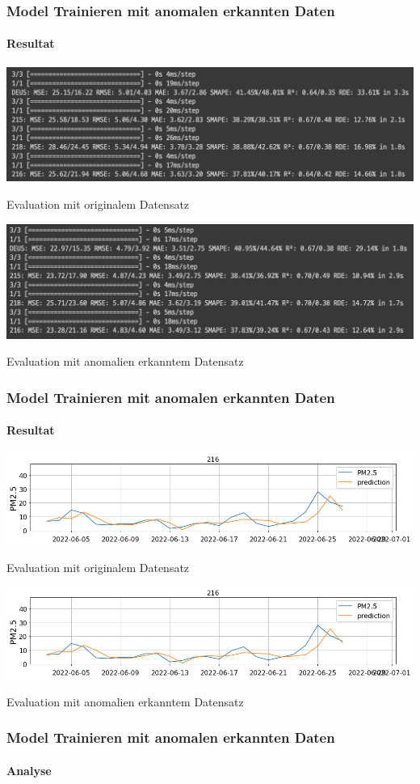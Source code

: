 \documentclass{beamer}
\begin{document}
    
    \begin{frame}
        \frametitle{Model Trainieren mit anomalen erkannten Daten}
        \framesubtitle{Resultat}
        \centering
        \includegraphics[scale=0.39]{prediction.png}
        \caption{Evaluation mit originalem Datensatz}
        \includegraphics[scale=0.39]{prediction_re.png}
        \caption{Evaluation mit anomalien erkanntem Datensatz}
    \end{frame}

    \begin{frame}
        \frametitle{Model Trainieren mit anomalen erkannten Daten}
        \framesubtitle{Resultat}
        \centering
        \includegraphics[scale=0.29]{216.png}
        \caption{Evaluation mit originalem Datensatz}
        \includegraphics[scale=0.29]{216_re.png}
        \caption{Evaluation mit anomalien erkanntem Datensatz}
    \end{frame}
    
    \begin{frame}
        \frametitle{Model Trainieren mit anomalen erkannten Daten}
        \framesubtitle{Analyse}
        \centering
    \end{frame}
    
\end{document}
